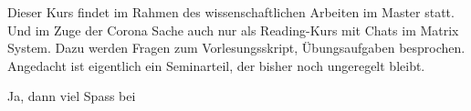 Dieser Kurs findet im Rahmen des wissenschaftlichen Arbeiten im Master statt. Und im Zuge der Corona Sache auch nur als Reading-Kurs mit Chats im Matrix System. Dazu werden Fragen zum Vorlesungsskript, Übungsaufgaben besprochen. Angedacht ist eigentlich ein Seminarteil, der bisher noch ungeregelt bleibt.

Ja, dann viel Spass bei 